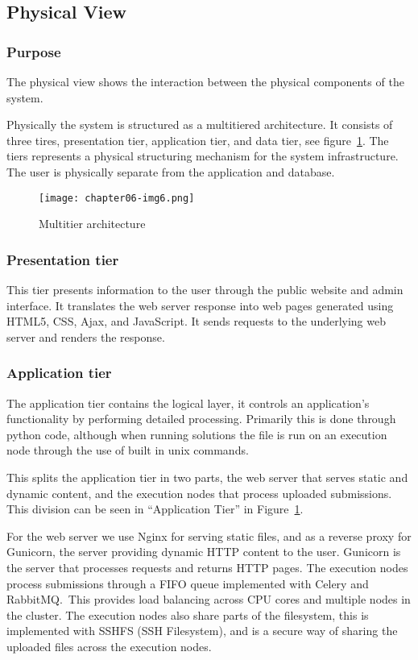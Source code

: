 \subsection{Physical View}
\label{sec:physicalView}

\subsubsection{Purpose}
The physical view shows the interaction between the physical components
of the system.

Physically the system is structured as a multitiered architecture. It
consists of three tires, presentation tier, application tier, and data
tier, see figure~\ref{fig:multitier}. The tiers represents a physical
structuring mechanism for the system infrastructure. The user is physically
separate from the application and database. 

\begin{figure}[h]
	\centering
	\texttt{[image: chapter06-img6.png]}
	\caption{Multitier architecture}
	\label{fig:multitier}
\end{figure}
\subsubsection{Presentation tier}

This tier presents information to the user through the public website
and admin interface. It translates the web server response into web
pages generated using HTML5, CSS, Ajax, and JavaScript. It sends
requests to the underlying web server and renders the response.

\subsubsection{Application tier}\label{section:applicationTier}

The application tier contains the logical layer, it controls an
application's functionality by performing detailed
processing. Primarily this is done through python code, although when
running solutions the file is run on an execution node through the use
of built in unix commands. 

This splits the application tier in two parts, the web server that
serves static and dynamic content, and the execution nodes that process
uploaded submissions. This division can be seen in
``Application Tier'' in Figure~\ref{fig:multitier}.


For the web server we use Nginx for serving static files, and as a
reverse proxy for Gunicorn, the server providing dynamic HTTP content
to the user. Gunicorn is the server that processes requests and returns
HTTP pages. The execution nodes process submissions through a FIFO
queue implemented with Celery and RabbitMQ.\ This provides load
balancing across CPU cores and multiple nodes in the cluster. The
execution nodes also share parts of the filesystem, this is implemented
with SSHFS (SSH Filesystem), and is a secure way of sharing the
uploaded files across the execution nodes. 


